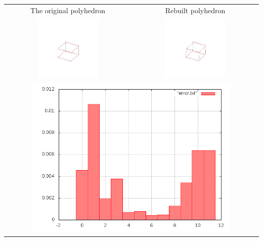 \documentclass[11pt,fleqn,a4paper]{scrartcl}
\begin{document}
\begin{center}

\begin{tabular}{|c|c|}
\hline
The original polyhedron& Rebuilt polyhedron \\
\includegraphics[width=0.5\textwidth]{variant2/images/4/input.png} &
\includegraphics[width=0.5\textwidth]{variant2/images/4/out.png} \\
\midrule
\multicolumn{2}{|c|}{ \includegraphics[width=0.8\textwidth]{variant2/images/4/error.png}} \\
\hline
\end{tabular}
\end{center}
\end{document}
